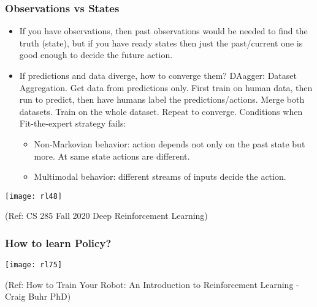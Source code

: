 \begin{frame}[fragile]\frametitle{Observations vs States}

\begin{itemize}
\item If you have observations, then past observations would be needed to find the truth (state), but if you have ready states then just the past/current one is good enough to decide the future action.
\item If predictions and data diverge, how to converge them? DAagger: Dataset Aggregation. Get data from predictions only. First train on human data, then run to predict, then have humans label the predictions/actions. Merge both datasets. Train on the whole dataset. Repeat to converge.
Conditions when Fit-the-expert strategy fails:
\begin{itemize}
\item Non-Markovian behavior: action depends not only on the past state but more. At same state actions are different.
\item 	Multimodal behavior: different streams of inputs decide the action.
\end{itemize}

\end{itemize}


\begin{center}
\texttt{[image: rl48]}
\end{center}


{\tiny (Ref: CS 285 Fall 2020 Deep Reinforcement Learning)}

\end{frame}

\begin{frame}[fragile]\frametitle{How to learn Policy?}


\begin{center}
\texttt{[image: rl75]}
\end{center}

{\tiny (Ref: How to Train Your Robot: An Introduction to Reinforcement Learning - Craig Buhr PhD)}

\end{frame}


